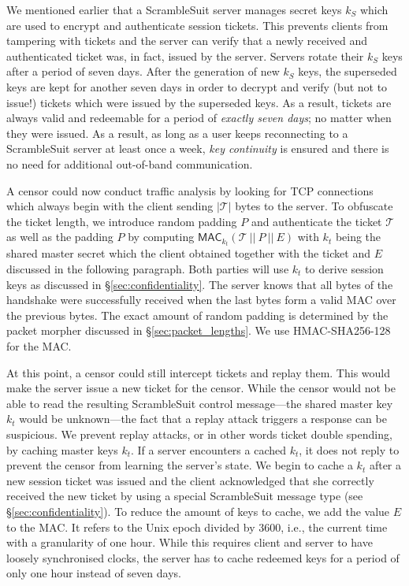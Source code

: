 \documentclass{sig-alternate}
\newcommand{\pt}{\textsf{ScrambleSuit}}
\numberwithin{enumi}{section}
\numberwithin{notesctr}{section}
\begin{document}
We mentioned earlier that a \pt{} server manages secret keys $k_{S}$ which are used to encrypt and
authenticate session tickets. This prevents clients from tampering with tickets and the server can
verify that a newly received and authenticated ticket was, in fact, issued by the server. Servers
rotate their $k_{S}$ keys after a period of seven days. After the generation of new $k_{S}$ keys,
the superseded keys are kept for another seven days in order to decrypt and verify (but not to
issue!) tickets which were issued by the superseded keys. As a result, tickets are always
valid and redeemable for a period of \emph{exactly seven days}; no matter when they were issued. As
a result, as long as a user keeps reconnecting to a \pt{} server at least once a week, \emph{key
continuity} is ensured and there is no need for additional out-of-band communication.

A censor could now conduct traffic analysis by looking for TCP connections which always begin with
the client sending $|\mathcal{T}|$ bytes to the server. To obfuscate the ticket length, we introduce
random padding $P$ and authenticate the ticket $\mathcal{T}$ as well as the padding $P$ by computing
$\textsf{MAC}_{k_{t}}(\mathcal{T}\ ||\ P\ ||\ E)$ with $k_{t}$ being the shared master secret which
the client obtained together with the ticket and $E$ discussed in the following paragraph. Both
parties will use $k_{t}$ to derive session keys as discussed in \S \ref{sec:confidentiality}. The
server knows that all bytes of the handshake were successfully received when the last bytes form a
valid MAC over the previous bytes. The exact amount of random padding is determined by the packet
morpher discussed in \S \ref{sec:packet_lengths}. We use HMAC-SHA256-128 for the MAC.

At this point, a censor could still intercept tickets and replay them. This would make the server
issue a new ticket for the censor. While the censor would not be able to read the resulting \pt{}
control message---the shared master key $k_{t}$ would be unknown---the fact that a replay attack
triggers a response can be suspicious. We prevent replay attacks, or in other words ticket double
spending, by caching master keys $k_{t}$. If a server encounters a cached $k_{t}$, it does not reply
to prevent the censor from learning the server's state. We begin to cache a $k_{t}$ after a new session
ticket was issued and the client acknowledged that she correctly received the new ticket by using a
special \pt{} message type (see \S \ref{sec:confidentiality}). To reduce the amount of keys to
cache, we add the value $E$ to the MAC. It refers to the Unix epoch divided by 3600, i.e., the
current time with a granularity of one hour. While this requires client and server to have loosely
synchronised clocks, the server has to cache redeemed keys for a period of only one hour instead of
seven days.
\end{document}
